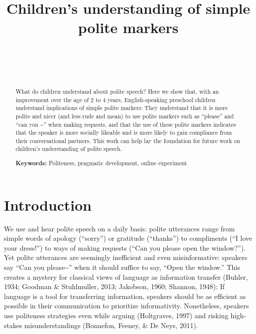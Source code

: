 \documentclass[10pt, letterpaper]{article}
\title{Children's understanding of simple polite markers}
\author{{\large \bf } \\ \texttt{} \\  \\}
\begin{document}
\maketitle

\begin{abstract}
What do children understand about polite speech? Here we show that, with
an improvement over the age of 2 to 4 years, English-speaking preschool
children understand implications of simple polite markers: They
understand that it is more polite and nicer (and less rude and mean) to
use polite markers such as ``please'' and ``can you \textasciitilde{}''
when making requests, and that the use of these polite markers indicates
that the speaker is more socially likeable and is more likely to gain
compliance from their conversational partners. This work can help lay
the foundation for future work on children's understanding of polite
speech.

\textbf{Keywords:}
Politeness, pragmatic development, online experiment
\end{abstract}

\section{Introduction}\label{introduction}

We use and hear polite speech on a daily basis: polite utterances range
from simple words of apology (``sorry'') or gratitude (``thanks'') to
compliments (``I love your dress!'') to ways of making requests (``Can
you please open the window?''). Yet polite utterances are seemingly
inefficient and even misinformative: speakers say ``Can you
please\textasciitilde{}'' when it should suffice to say, ``Open the
window.'' This creates a mystery for classical views of language as
information transfer (Buhler, 1934; Goodman \& Stuhlmuller, 2013;
Jakobson, 1960; Shannon, 1948): If language is a tool for transferring
information, speakers should be as efficient as possible in their
communication to prioritize informativity. Nonetheless, speakers use
politeness strategies even while arguing (Holtgraves, 1997) and risking
high-stakes misunderstandings (Bonnefon, Feeney, \& De Neys, 2011).
\end{document}
